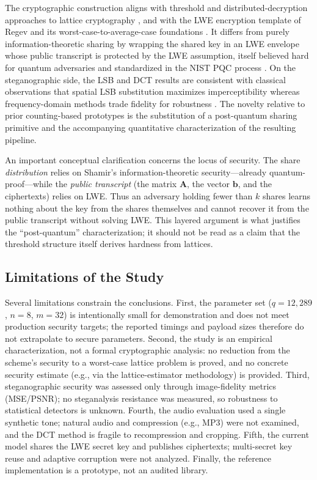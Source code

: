 \documentclass[preprint,12pt,number]{elsarticle}
\begin{document}
The cryptographic construction aligns with threshold and distributed-decryption
approaches to lattice cryptography
\citep{bendlin2010,desmedt1994,gemmell1997}, and with the LWE encryption
template of Regev \citep{regev2005} and its worst-case-to-average-case
foundations \citep{peikert2009,micciancio2009}. It differs from purely
information-theoretic sharing \citep{shamir1979,blakley1979} by wrapping the
shared key in an LWE envelope whose public transcript is protected by the LWE
assumption, itself believed hard for quantum adversaries and standardized in
the NIST PQC process \citep{nist2024,avanzi2020}. On the steganographic side,
the LSB and DCT results are consistent with classical observations that spatial
LSB substitution maximizes imperceptibility \citep{chan2004,bender1996} whereas
frequency-domain methods trade fidelity for robustness \citep{westfeld2001,fridrich2009}.
The novelty relative to prior counting-based prototypes is the substitution of
a post-quantum sharing primitive and the accompanying quantitative
characterization of the resulting pipeline.

An important conceptual clarification concerns the locus of security. The
share \emph{distribution} relies on Shamir's information-theoretic
security---already quantum-proof---while the \emph{public transcript} (the
matrix $\mathbf{A}$, the vector $\mathbf{b}$, and the ciphertexts) relies on
LWE. Thus an adversary holding fewer than $k$ shares learns nothing about the
key from the shares themselves and cannot recover it from the public transcript
without solving LWE. This layered argument is what justifies the
``post-quantum'' characterization; it should not be read as a claim that the
threshold structure itself derives hardness from lattices.

\subsection{Limitations of the Study}

Several limitations constrain the conclusions. First, the parameter set
($q = 12{,}289$, $n = 8$, $m = 32$) is intentionally small for demonstration and
does not meet production security targets; the reported timings and payload
sizes therefore do not extrapolate to secure parameters. Second, the study is
an empirical characterization, not a formal cryptographic analysis: no
reduction from the scheme's security to a worst-case lattice problem is proved,
and no concrete security estimate (e.g., via the lattice-estimator methodology)
is provided. Third, steganographic security was assessed only through
image-fidelity metrics (MSE/PSNR); no steganalysis resistance was measured, so
robustness to statistical detectors \citep{westfeld2001,fridrich2009} is
unknown. Fourth, the audio evaluation used a single synthetic tone; natural
audio and compression (e.g., MP3) were not examined, and the DCT method is
fragile to recompression and cropping. Fifth, the current model shares the LWE
secret key and publishes ciphertexts; multi-secret key reuse and adaptive
corruption were not analyzed. Finally, the reference implementation is a
prototype, not an audited library.
\end{document}
